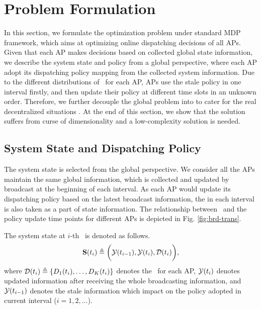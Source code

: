 \section{Problem Formulation}
In this section, we formulate the optimization problem under standard MDP framework, which aims at optimizing online dispatching decisions of all APs.
Given that each AP makes decisions based on collected global state information, we describe the system state and policy from a global perspective, where each AP adopt its dispatching policy mapping from the collected system information.
Due to the different distributions of \brdelay~for each AP, APs use the stale policy in one interval firstly, and then update their policy at different time slots in an unknown order.
Therefore, we further decouple the global problem into  to cater for the real decentralized situations .
At the end of this section, we show that the solution suffers from curse of dimensionality and a low-complexity solution is needed.

\subsection{System State and Dispatching Policy}
The system state is selected from the global perspective.
We consider all the APs maintain the same global information, which is collected and updated by broadcast at the beginning of each interval.
As each AP would update its dispatching policy based on the latest broadcast information, the  in each interval is also taken as a part of state information.
The relationship between \brdelay~and the policy update time points for different APs is depicted in Fig. \ref{fig:brd-trans}.
\begin{definition}
    The system state at $i$-th \brpoint~is denoted as follows.
    \begin{align}
        \mathbf{S}(t_i) \triangleq \bigg(
            \mathcal{Y}(t_{i-1}), \mathcal{Y}({t_{i}}), \mathcal{D}(t_{i})
        \bigg),
    \end{align}
    where $\mathcal{D}(t_{i}) \triangleq \{D_{1}(t_{i}), \dots, D_{K}(t_{i})\}$ denotes the \brdelay~for each AP, $\mathcal{Y}(t_{i})$ denotes updated information after receiving the whole broadcasting information, and $\mathcal{Y}(t_{i-1})$ denotes the stale information which impact on the policy adopted in current interval ($i=1,2,\dots$).
\end{definition}

